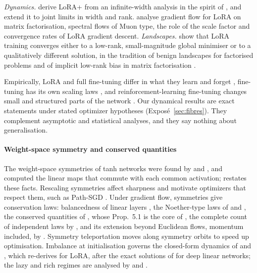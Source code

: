 \emph{Dynamics.} \citet{hayou2024lora} derive LoRA+ from an infinite-width analysis in the spirit of \citet{xyang2021feature}, and \citet{chen2026learning} extend it to joint limits in width and rank. \citet{xu2025understanding} analyse gradient flow for LoRA on matrix factorisation, \citet{kang2026uniform} spectral flows of Muon type, \citet{zhang2026hidden} the role of the scale factor and \citet{mu2025convergence} convergence rates of LoRA gradient descent.
\emph{Landscapes.} \citet{kim2025lora} show that LoRA training converges either to a low-rank, small-magnitude global minimiser or to a qualitatively different solution, in the tradition of benign landscapes for factorised problems \citep{xburer2003nonlinear,xge2017no} and of implicit low-rank bias in matrix factorisation \citep{xgunasekar2017implicit,arora2019implicit}.

Empirically, LoRA and full fine-tuning differ in what they learn and forget \citep{biderman2024lora,shuttleworth2024lora}, fine-tuning has its own scaling laws \citep{zhang2024scaling}, and reinforcement-learning fine-tuning changes small and structured parts of the network \citep{mukherjee2025reinforcement,zhu2025path,shenfeld2025rl}. Our dynamical results are exact statements under stated optimizer hypotheses (Exposé~\ref{sec:fibres}). They complement asymptotic and statistical analyses, and they say nothing about generalisation.

\paragraph{Weight-space symmetry and conserved quantities}
The weight-space symmetries of tanh networks were found by \citet{xsussmann1992uniqueness} and \citet{xchen1993geometry}, and \citet{xgodfrey2022symmetries} computed the linear maps that commute with each common activation;  restates these facts. Rescaling symmetries affect sharpness \citep{xdinh2017sharp} and motivate optimizers that respect them, such as Path-SGD \citep{xneyshabur2015path}. Under gradient flow, symmetries give conservation laws: balancedness of linear layers \citep{du2018algorithmic,arora2018optimization}, the Noether-type laws of \citet{kunin2020neural} and \citet{xtanaka2021noether}, the conserved quantities of \citet{zhao2022symmetries}, whose Prop.~5.1 is the core of , the complete count of independent laws by \citet{marcotte2023abide}, and its extension beyond Euclidean flows, momentum included, by \citet{xmarcotte2024keep}. Symmetry teleportation \citep{xzhao2022teleportation} moves along symmetry orbits to speed up optimisation. Imbalance at initialisation governs the closed-form dynamics of \citet{xtarmoun2021understanding} and \citet{xmin2021explicit}, which  re-derives for LoRA, after the exact solutions of \citet{xsaxe2014exact} for deep linear networks; the lazy and rich regimes are analysed by \citet{xdomine2025lazy} and \citet{xkunin2024get}.

